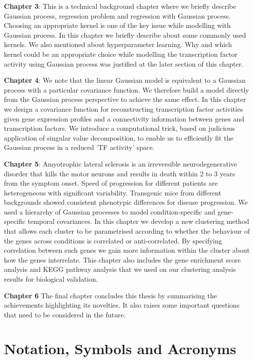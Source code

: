 \textbf{Chapter 3}:
This is a technical background chapter where we briefly describe Gaussian process, regression problem and
regression with Gaussian process. Choosing an appropriate kernel is one of the key issue while modelling
with Gaussian process. In this chapter we briefly describe about some commonly used kernels. We also 
mentioned about hyperparameter learning. Why and which kernel could be an appropriate choice while 
modelling the transcription factor activity using Gaussian process was justified at the later section of 
this chapter.

\textbf{Chapter 4}:
We note that the linear Gaussian model is equivalent to a Gaussian process with a particular covariance 
function. We therefore build a model directly from the Gaussian process perspective to achieve the same 
effect. In this chapter we design a covariance function for reconstructing transcription factor activities 
given gene expression profiles and a connectivity information between genes and transcription factors. 
We introduce a computational trick, based on  judicious application of singular value 
decomposition, to enable us to efficiently fit the Gaussian process in a reduced 'TF activity' space. 

\textbf{Chapter 5}:
Amyotrophic lateral sclerosis is an irreversible neurodegenerative disorder that kills the
motor neurons and results in death within 2 to 3 years from the symptom onset.  Speed of progression 
for different patients are heterogeneous with significant variability. Transgenic mice from different 
backgrounds showed consistent phenotypic differences for disease progression. We used a hierarchy 
of Gaussian processes to model condition-specific and gene-specific temporal covariances.
In this chapter we develop a new clustering method that allows each cluster to be parametrised 
according to whether the behaviour of the genes across conditions is correlated or anti-correlated. 
By specifying correlation between such genes we gain more information within the cluster about 
how the genes interrelate. This chapter also includes the gene enrichment score analysis and KEGG
pathway analysis that we used on our clustering analysis results for biological validation.

\textbf{Chapter 6}
The final chapter concludes this thesis by summarising the achievements highlighting its novelties.
It also raises some important questions that need to be considered in the future.

\section{Notation, Symbols and Acronyms}

